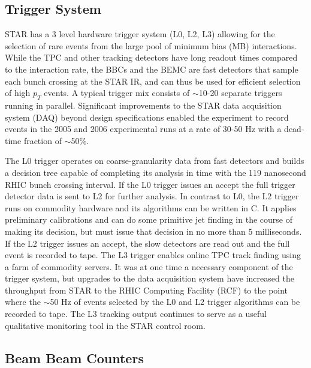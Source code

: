 \subsection{Trigger System}

STAR has a 3 level hardware trigger system (L0, L2, L3) \cite{Bieser:2002ah,
Adler:2002ab} allowing for the selection of rare events from the large pool of
minimum bias (MB) interactions. While the TPC and other tracking detectors
have long readout times compared to the interaction rate, the BBCs and the
BEMC are fast detectors that sample each bunch crossing at the STAR IR, and
can thus be used for efficient selection of high $p_T$ events. A typical
trigger mix consists of $\sim$10-20 separate triggers running in parallel.
Significant improvements to the STAR data acquisition system (DAQ) beyond
design specifications enabled the experiment to record events in the 2005 and
2006 experimental runs at a rate of 30-50 Hz with a dead-time fraction of
$\sim$50\%.

The L0 trigger operates on coarse-granularity data from fast detectors and
builds a decision tree capable of completing its analysis in time with the 119
nanosecond RHIC bunch crossing interval. If the L0 trigger issues an accept
the full trigger detector data is sent to L2 for further analysis. In contrast
to L0, the L2 trigger runs on commodity hardware and its algorithms can be
written in C. It applies preliminary calibrations and can do some primitive
jet finding in the course of making its decision, but must issue that decision
in no more than 5 milliseconds. If the L2 trigger issues an accept, the slow
detectors are read out and the full event is recorded to tape. The L3 trigger
\cite{Adler:2002ab} enables online TPC track finding using a farm of commodity
servers. It was at one time a necessary component of the trigger system, but
upgrades to the data acquisition system have increased the throughput from
STAR to the RHIC Computing Facility (RCF) to the point where the $\sim$50 Hz
of events selected by the L0 and L2 trigger algorithms can be recorded to
tape. The L3 tracking output continues to serve as a useful qualitative
monitoring tool in the STAR control room.

\subsection{Beam Beam Counters\label{sec:bbc}}

